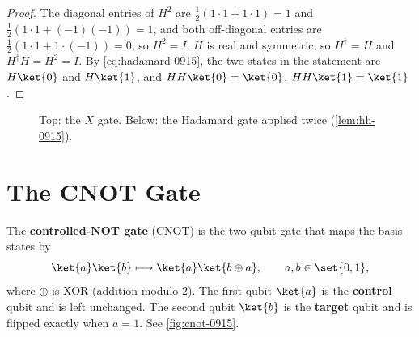 \begin{proof}
    The diagonal entries of $H^2$ are $\frac{1}{2}(1 \cdot 1 + 1 \cdot 1) = 1$
    and $\frac{1}{2}(1 \cdot 1 + (-1)(-1)) = 1$, and both off-diagonal entries are
    $\frac{1}{2}(1 \cdot 1 + 1 \cdot (-1)) = 0$, so $H^2 = I$.
    $H$ is real and symmetric, so $H^\dagger = H$ and $H^\dagger H = H^2 = I$.
    By \cref{eq:hadamard-0915}, the two states in the statement are $H \ket{0}$ and $H \ket{1}$, and
    $H H \ket{0} = \ket{0}$, $H H \ket{1} = \ket{1}$.
\end{proof}

\begin{figure}[ht]
    \centering
    \caption{Top: the $X$ gate. Below: the Hadamard gate applied twice (\cref{lem:hh-0915}).}
    \label{fig:xh-0915}
\end{figure}

\section{The CNOT Gate}

\begin{definition}\label{def:cnot-0915}
    The \textbf{controlled-NOT gate} (CNOT) is the two-qubit gate that maps the basis states by
    \[\ket{a} \ket{b} \longmapsto \ket{a} \ket{b \oplus a}, \qquad a, b \in \set{0,1},\]
    where $\oplus$ is XOR (addition modulo $2$). The first qubit $\ket{a}$ is the \textbf{control}
    qubit and is left unchanged. The second qubit $\ket{b}$ is the \textbf{target} qubit and is flipped
    exactly when $a = 1$. See \cref{fig:cnot-0915}.
\end{definition}

